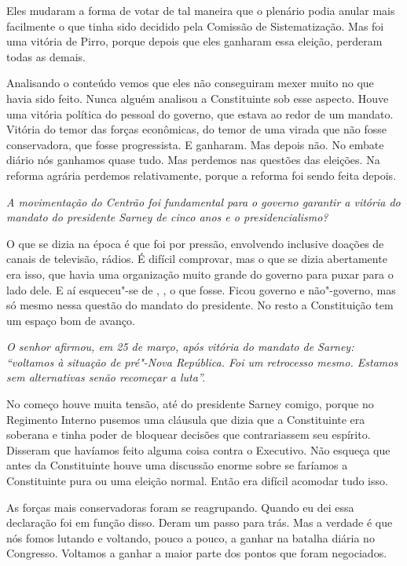 Eles mudaram a forma de votar de tal maneira que o plenário podia anular
mais facilmente o que tinha sido decidido pela Comissão de
Sistematização. Mas foi uma vitória de Pirro, porque depois que eles
ganharam essa eleição, perderam todas as demais.

Analisando o conteúdo vemos que eles não conseguiram mexer muito no que
havia sido feito. Nunca alguém analisou a Constituinte sob esse aspecto.
Houve uma vitória política do pessoal do governo, que estava ao redor de
um mandato. Vitória do temor das forças econômicas, do temor de uma
virada que não fosse conservadora, que fosse progressista. E ganharam.
Mas depois não. No embate diário nós ganhamos quase tudo. Mas perdemos
nas questões das eleições. Na reforma agrária perdemos relativamente,
porque a reforma foi sendo feita depois.

\medskip

\emph{A movimentação do Centrão foi fundamental para o governo
garantir a vitória do mandato do presidente Sarney de cinco anos e o
presidencialismo?}

O que se dizia na época é que foi por pressão, envolvendo
inclusive doações de canais de televisão, rádios. É difícil comprovar,
mas o que se dizia abertamente era isso, que havia uma organização muito
grande do governo para puxar para o lado dele. E aí esqueceu"-se de ,
, o que fosse. Ficou governo e não"-governo, mas só mesmo nessa
questão do mandato do presidente. No resto a Constituição tem um espaço
bom de avanço.

\medskip

\emph{O senhor afirmou, em 25 de março, após vitória do mandato de
Sarney: ``voltamos à situação de pré"-Nova República. Foi um retrocesso
mesmo. Estamos sem alternativas senão recomeçar a luta''.}

No começo houve muita tensão, até do presidente Sarney
comigo, porque no Regimento Interno pusemos uma cláusula que dizia que a
Constituinte era soberana e tinha poder de bloquear decisões que
contrariassem seu espírito. Disseram que havíamos feito alguma coisa
contra o Executivo. Não esqueça que antes da Constituinte houve uma
discussão enorme sobre se faríamos a Constituinte pura ou uma eleição
normal. Então era difícil acomodar tudo isso.

As forças mais conservadoras foram se reagrupando. Quando eu dei essa
declaração foi em função disso. Deram um passo para trás. Mas a verdade
é que nós fomos lutando e voltando, pouco a pouco, a ganhar na batalha
diária no Congresso. Voltamos a ganhar a maior parte dos pontos que
foram negociados.

